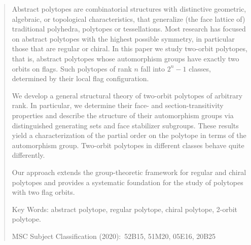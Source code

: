 \documentclass[12pt]{article}
\renewcommand{\>}{\rangle}
\theoremstyle{definition}\newtheorem{definition}{Definition}[section]
\begin{document}
\begin{abstract}


Abstract polytopes are combinatorial structures with distinctive geometric, algebraic, or topological characteristics, that generalize (the face lattice of) traditional polyhedra, polytopes or tessellations. Most research has focused on abstract polytopes with the highest possible symmetry, in particular those that are regular or chiral.
In this paper we study two-orbit polytopes, that is, abstract polytopes whose automorphism groups have exactly two orbits on flags. Such polytopes of rank $n$ fall into $2^n-1$ classes, determined by their local flag configuration.

We develop a general structural theory of two-orbit polytopes of arbitrary rank. In particular, we determine their face- and section-transitivity properties and describe the structure of their automorphism groups via distinguished generating sets and face stabilizer subgroups. These results yield a characterization of the partial order { on the polytope} in terms of the automorphism group. Two-orbit polytopes in different classes behave quite differently.

Our approach extends the group-theoretic framework for regular and chiral polytopes and provides a systematic foundation for the study of polytopes with two flag orbits.


\bigskip\medskip

\noindent
Key Words:  abstract polytope, regular polytope, chiral polytope, 2-orbit polytope.\medskip

\noindent
MSC Subject Classification (2020):\ 52B15, 51M20, 05E16, 20B25
\end{abstract}
\end{document}
